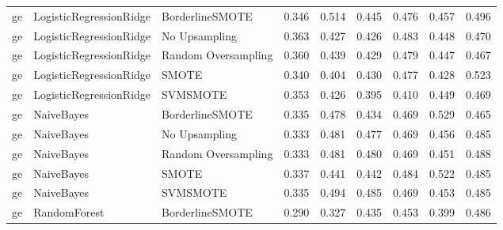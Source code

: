 \begin{tabular}{lllllllll}
      ge &      LogisticRegressionRidge &     BorderlineSMOTE & 0.346 &                     0.514 &                 0.445 &                  0.476 &                                   0.457 &     0.496 \\
      ge &      LogisticRegressionRidge &       No Upsampling & 0.363 &                     0.427 &                 0.426 &                  0.483 &                                   0.448 &     0.470 \\
      ge &      LogisticRegressionRidge & Random Oversampling & 0.360 &                     0.439 &                 0.429 &                  0.479 &                                   0.447 &     0.467 \\
      ge &      LogisticRegressionRidge &               SMOTE & 0.340 &                     0.404 &                 0.430 &                  0.477 &                                   0.428 &     0.523 \\
      ge &      LogisticRegressionRidge &            SVMSMOTE & 0.353 &                     0.426 &                 0.395 &                  0.410 &                                   0.449 &     0.469 \\
      ge &                   NaiveBayes &     BorderlineSMOTE & 0.335 &                     0.478 &                 0.434 &                  0.469 &                                   0.529 &     0.465 \\
      ge &                   NaiveBayes &       No Upsampling & 0.333 &                     0.481 &                 0.477 &                  0.469 &                                   0.456 &     0.485 \\
      ge &                   NaiveBayes & Random Oversampling & 0.333 &                     0.481 &                 0.480 &                  0.469 &                                   0.451 &     0.488 \\
      ge &                   NaiveBayes &               SMOTE & 0.337 &                     0.441 &                 0.442 &                  0.484 &                                   0.522 &     0.485 \\
      ge &                   NaiveBayes &            SVMSMOTE & 0.335 &                     0.494 &                 0.485 &                  0.469 &                                   0.453 &     0.485 \\
      ge &                 RandomForest &     BorderlineSMOTE & 0.290 &                     0.327 &                 0.435 &                  0.453 &                                   0.399 &     0.486 \\

\end{tabular}
